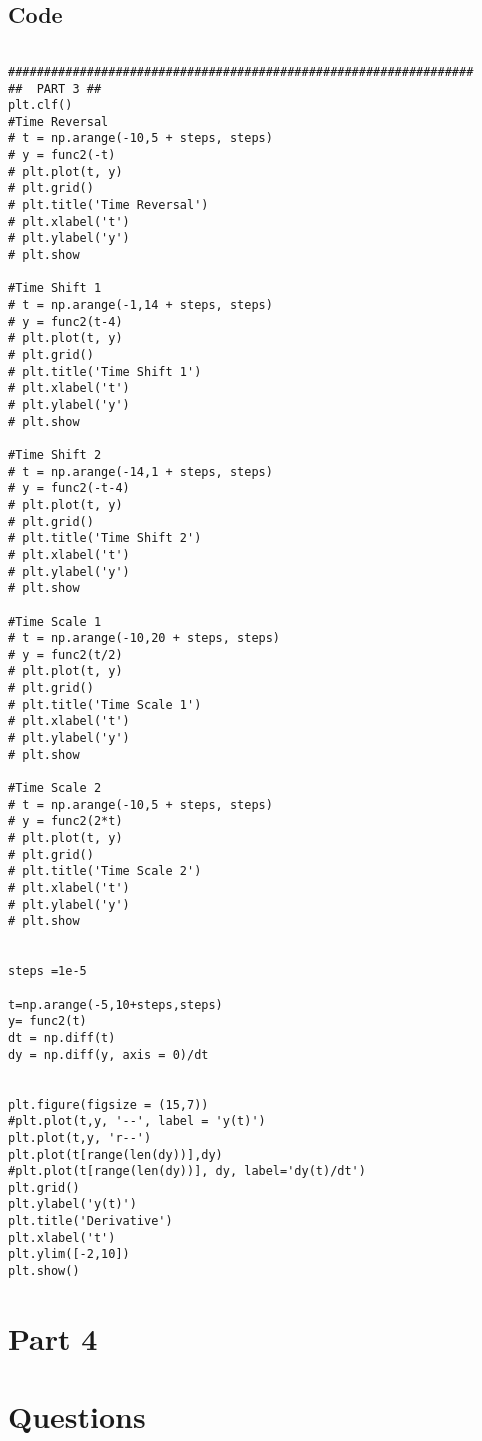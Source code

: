 \subsection{Code}

\begin{lstlisting}

#################################################################
##  PART 3 ##
plt.clf()
#Time Reversal
# t = np.arange(-10,5 + steps, steps)
# y = func2(-t)
# plt.plot(t, y)
# plt.grid()
# plt.title('Time Reversal')
# plt.xlabel('t')
# plt.ylabel('y')
# plt.show

#Time Shift 1
# t = np.arange(-1,14 + steps, steps)
# y = func2(t-4)
# plt.plot(t, y)
# plt.grid()
# plt.title('Time Shift 1')
# plt.xlabel('t')
# plt.ylabel('y')
# plt.show

#Time Shift 2
# t = np.arange(-14,1 + steps, steps)
# y = func2(-t-4)
# plt.plot(t, y)
# plt.grid()
# plt.title('Time Shift 2')
# plt.xlabel('t')
# plt.ylabel('y')
# plt.show

#Time Scale 1
# t = np.arange(-10,20 + steps, steps)
# y = func2(t/2)
# plt.plot(t, y)
# plt.grid()
# plt.title('Time Scale 1')
# plt.xlabel('t')
# plt.ylabel('y')
# plt.show

#Time Scale 2
# t = np.arange(-10,5 + steps, steps)
# y = func2(2*t)
# plt.plot(t, y)
# plt.grid()
# plt.title('Time Scale 2')
# plt.xlabel('t')
# plt.ylabel('y')
# plt.show


steps =1e-5

t=np.arange(-5,10+steps,steps)
y= func2(t)
dt = np.diff(t)
dy = np.diff(y, axis = 0)/dt


plt.figure(figsize = (15,7))
#plt.plot(t,y, '--', label = 'y(t)')
plt.plot(t,y, 'r--')
plt.plot(t[range(len(dy))],dy)
#plt.plot(t[range(len(dy))], dy, label='dy(t)/dt')
plt.grid()
plt.ylabel('y(t)')
plt.title('Derivative')
plt.xlabel('t')
plt.ylim([-2,10])
plt.show()

\end{lstlisting}


\section{Part 4}


\section{Questions}

